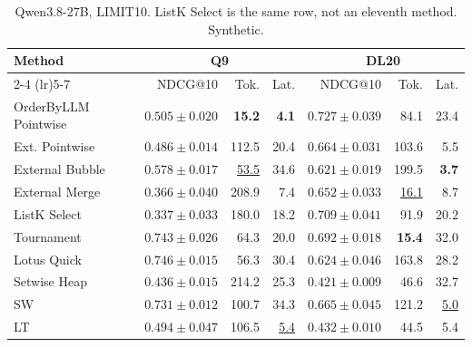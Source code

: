 \begin{table}[t]
\centering\footnotesize\setlength{\tabcolsep}{3.2pt}\renewcommand{\arraystretch}{1.12}
\caption{Qwen3.8-27B, LIMIT10. ListK Select is the same row, not an eleventh method. Synthetic.}
\begin{tabular}{@{}lrrrrrr@{}}
\toprule
Method & \multicolumn{3}{c}{Q9} & \multicolumn{3}{c}{DL20} \\
\cmidrule(lr){2-4} \cmidrule(lr){5-7}
 & NDCG@10 & Tok. & Lat. & NDCG@10 & Tok. & Lat. \\
\midrule
OrderByLLM Pointwise & $0.505\pm0.020$ & \textbf{15.2} & \textbf{4.1} & \textbf{$0.727\pm0.039$} & 84.1 & 23.4 \\
Ext. Pointwise & $0.486\pm0.014$ & 112.5 & 20.4 & $0.664\pm0.031$ & 103.6 & 5.5 \\
External Bubble & $0.578\pm0.017$ & \underline{53.5} & 34.6 & $0.621\pm0.019$ & 199.5 & \textbf{3.7} \\
External Merge & $0.366\pm0.040$ & 208.9 & 7.4 & $0.652\pm0.033$ & \underline{16.1} & 8.7 \\
ListK Select & $0.337\pm0.033$ & 180.0 & 18.2 & \underline{$0.709\pm0.041$} & 91.9 & 20.2 \\
Tournament & \underline{$0.743\pm0.026$} & 64.3 & 20.0 & $0.692\pm0.018$ & \textbf{15.4} & 32.0 \\
Lotus Quick & \textbf{$0.746\pm0.015$} & 56.3 & 30.4 & $0.624\pm0.046$ & 163.8 & 28.2 \\
Setwise Heap & $0.436\pm0.015$ & 214.2 & 25.3 & $0.421\pm0.009$ & 46.6 & 32.7 \\
SW & $0.731\pm0.012$ & 100.7 & 34.3 & $0.665\pm0.045$ & 121.2 & \underline{5.0} \\
LT & $0.494\pm0.047$ & 106.5 & \underline{5.4} & $0.432\pm0.010$ & 44.5 & 5.4 \\
\bottomrule
\end{tabular}
\end{table}

